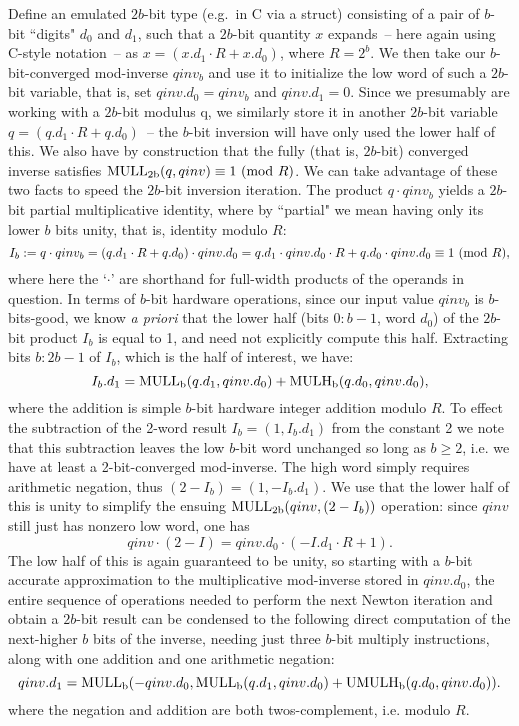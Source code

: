 \documentclass{article}
\begin{document}
Define an emulated $2b$-bit type (e.g.~in C via a struct) consisting of a pair of $b$-bit ``digits" $d_0$ and $d_1$, such that a $2b$-bit quantity $x$ expands~-- here again using C-style notation~-- as $x = (x.d_1 \cdot R + x.d_0)$, where $R = 2^b$. We then take our $b$-bit-converged mod-inverse $qinv_b$ and use it to initialize the low word of such a $2b$-bit variable, that is, set $qinv.d_0 = qinv_b$ and $qinv.d_1 = 0$. Since we presumably are working with a $2b$-bit modulus q, we similarly store it in another $2b$-bit variable $q = (q.d_1 \cdot R + q.d_0)$~-- the $b$-bit inversion will have only used the lower half of this. We also have by construction that the fully (that is, $2b$-bit) converged inverse satisfies ${\rm MULL_{2b}}(q, qinv) \equiv 1\ ({\rm mod}\ R)$. We can take advantage of these two facts to speed the $2b$-bit inversion iteration. The product $q\cdot qinv_b$ yields a $2b$-bit partial multiplicative identity, where by ``partial" we mean having only its lower $b$ bits unity, that is, identity modulo $R$:
$$
	I_b := q \cdot qinv_b = (q.d_1 \cdot R + q.d_0) \cdot qinv.d_0 = q.d_1 \cdot qinv.d_0 \cdot R + q.d_0 \cdot qinv.d_0 \equiv 1\ ({\rm mod}\ R),
$$
where here the `$\cdot$' are shorthand for full-width products of the operands in question. In terms of $b$-bit hardware operations, since our input value $qinv_b$ is $b$-bits-good, we know {\em a priori} that the lower half (bits $0:b-1$, word $d_0$) of the $2b$-bit product $I_b$ is equal to 1, and need not explicitly compute this half. Extracting bits $b:2b-1$ of $I_b$, which is the half of interest, we have:
$$
	I_b.d_1 = {\rm MULL_b}(q.d_1, qinv.d_0) + {\rm MULH_b}(q.d_0, qinv.d_0),
$$
where the addition is simple $b$-bit hardware integer addition modulo $R$. To effect the subtraction of the 2-word result $I_b = (1, I_b.d_1)$ from the constant 2 we note that this subtraction leaves the low $b$-bit word unchanged so long as $b \ge 2$, i.e. we have at least a 2-bit-converged mod-inverse. The high word simply requires arithmetic negation, thus $(2-I_b) = (1, -I_b.d_1)$. We use that the lower half of this is unity to simplify the ensuing ${\rm MULL_{2b}}(qinv, (2-I_b))$ operation: since $qinv$ still just has nonzero low word, one has
$$
	qinv \cdot (2-I) = qinv.d_0 \cdot (-I.d_1 \cdot R + 1).
$$
The low half of this is again guaranteed to be unity, so starting with a $b$-bit accurate approximation to the multiplicative mod-inverse stored in $qinv.d_0$, the entire sequence of operations needed to perform the next Newton iteration and obtain a $2b$-bit result can be condensed to the following direct computation of the next-higher $b$ bits of the inverse, needing just three $b$-bit multiply instructions, along with one addition and one arithmetic negation:
\begin{equation}
	qinv.d_1 = {\rm MULL_b}(-qinv.d_0, {\rm MULL_b}(q.d_1, qinv.d_0) + {\rm UMULH_b}(q.d_0, qinv.d_0)) .
\label{next_b}
\end{equation}
where the negation and addition are both twos-complement, i.e. modulo $R$.
\end{document}
